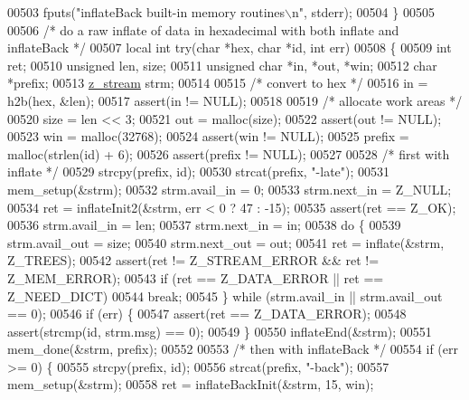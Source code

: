 \begin{DoxyCode}
{{{{{00503     fputs(\textcolor{stringliteral}{"inflateBack built-in memory routines\(\backslash\)n"}, stderr);
00504 \}
00505 
00506 \textcolor{comment}{/* do a raw inflate of data in hexadecimal with both inflate and inflateBack */}
00507 local \textcolor{keywordtype}{int} \textcolor{keywordflow}{try}(\textcolor{keywordtype}{char} *hex, \textcolor{keywordtype}{char} *\textcolor{keywordtype}{id}, \textcolor{keywordtype}{int} err)
00508 \{
00509     \textcolor{keywordtype}{int} ret;
00510     \textcolor{keywordtype}{unsigned} len, size;
00511     \textcolor{keywordtype}{unsigned} \textcolor{keywordtype}{char} *in, *out, *win;
00512     \textcolor{keywordtype}{char} *prefix;
00513     \hyperlink{structz__stream__s}{z\_stream} strm;
00514 
00515     \textcolor{comment}{/* convert to hex */}
00516     in = h2b(hex, &len);
00517     assert(in != NULL);
00518 
00519     \textcolor{comment}{/* allocate work areas */}
00520     size = len << 3;
00521     out = malloc(size);
00522     assert(out != NULL);
00523     win = malloc(32768);
00524     assert(win != NULL);
00525     prefix = malloc(strlen(\textcolor{keywordtype}{id}) + 6);
00526     assert(prefix != NULL);
00527 
00528     \textcolor{comment}{/* first with inflate */}
00529     strcpy(prefix, \textcolor{keywordtype}{id});
00530     strcat(prefix, \textcolor{stringliteral}{"-late"});
00531     mem\_setup(&strm);
00532     strm.avail\_in = 0;
00533     strm.next\_in = Z\_NULL;
00534     ret = inflateInit2(&strm, err < 0 ? 47 : -15);
00535     assert(ret == Z\_OK);
00536     strm.avail\_in = len;
00537     strm.next\_in = in;
00538     \textcolor{keywordflow}{do} \{
00539         strm.avail\_out = size;
00540         strm.next\_out = out;
00541         ret = inflate(&strm, Z\_TREES);
00542         assert(ret != Z\_STREAM\_ERROR && ret != Z\_MEM\_ERROR);
00543         \textcolor{keywordflow}{if} (ret == Z\_DATA\_ERROR || ret == Z\_NEED\_DICT)
00544             \textcolor{keywordflow}{break};
00545     \} \textcolor{keywordflow}{while} (strm.avail\_in || strm.avail\_out == 0);
00546     \textcolor{keywordflow}{if} (err) \{
00547         assert(ret == Z\_DATA\_ERROR);
00548         assert(strcmp(\textcolor{keywordtype}{id}, strm.msg) == 0);
00549     \}
00550     inflateEnd(&strm);
00551     mem\_done(&strm, prefix);
00552 
00553     \textcolor{comment}{/* then with inflateBack */}
00554     \textcolor{keywordflow}{if} (err >= 0) \{
00555         strcpy(prefix, \textcolor{keywordtype}{id});
00556         strcat(prefix, \textcolor{stringliteral}{"-back"});
00557         mem\_setup(&strm);
00558         ret = inflateBackInit(&strm, 15, win);
}}}}}
\end{DoxyCode}
